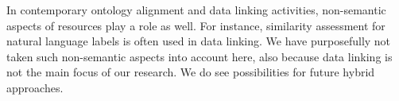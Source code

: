 In contemporary ontology alignment and data linking activities,
  non-semantic aspects of resources play a role as well.
For instance, similarity assessment for natural language labels is often
  used in data linking.
We have purposefully not taken such non-semantic aspects into account here,
  also because data linking is not the main focus of our research.
We do see possibilities for future hybrid approaches.

